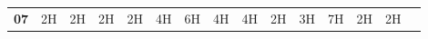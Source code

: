 \documentclass[10pt,landscape,a4paper]{article}
\begin{document}
\begin{textblock}{30}
\begin{table}[]
\begin{tabular}{lcccccccccccccc}
\multicolumn{1}{|l|}{\textbf{07}} & \multicolumn{1}{c|}{2H}                                                                & \multicolumn{1}{c|}{2H}    & \multicolumn{1}{c|}{2H}                                                               & \multicolumn{1}{c|}{2H}                                                                & \multicolumn{1}{c|}{4H}                                             & \multicolumn{1}{c|}{6H}                                                     & \multicolumn{1}{c||}{4H}                                                                     & \multicolumn{1}{c|}{4H}    & \multicolumn{1}{c|}{2H}    & \multicolumn{1}{c|}{3H}                                                                                   & \multicolumn{1}{c|}{7H}                                                                            & \multicolumn{1}{c|}{2H}                                                       & \multicolumn{1}{c|}{2H}        & \multicolumn{1}{c|}{}                                                \\ \cline{1-14}

\end{tabular}
\end{table}
\end{textblock}
\end{document}
